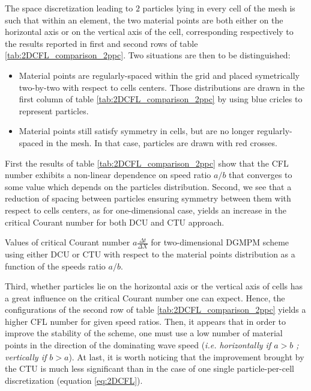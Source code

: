 The space discretization leading to $2$ particles lying in every cell of the mesh is such that within an element, the two material points are both either on the horizontal axis or on the vertical axis of the cell, corresponding respectively to the results reported in first and second rows of table \ref{tab:2DCFL_comparison_2ppc}. Two situations are then to be distinguished:
\begin{itemize}
\item Material points are regularly-spaced within the grid and placed symetrically two-by-two with respect to cells centers. Those distributions are drawn in the first column of table \ref{tab:2DCFL_comparison_2ppc} by using blue cricles to represent particles.
\item Material points still satisfy symmetry in cells, but are no longer regularly-spaced in the mesh. In that case, particles are drawn with red crosses.
\end{itemize}
First the results of table \ref{tab:2DCFL_comparison_2ppc} show that the CFL number exhibits a non-linear dependence on speed ratio $a/b$ that converges to some value which depends on the particles distribution. Second, we see that a reduction of spacing between particles ensuring symmetry between them with respect to cells centers, as for one-dimensional case, yields an increase in the critical Courant number for both DCU and CTU approach. 
\begin{table}[h]
  \centering
  
  \caption{Values of critical Courant number $a\frac{\Delta t}{\Delta X}$ for two-dimensional DGMPM scheme using either DCU or CTU with respect to the material points distribution as a function of the speeds ratio $a/b$.}
  \label{tab:2DCFL_comparison_4ppc}
\end{table}
Third, whether particles lie on the horizontal axis or the vertical axis of cells has a great influence on the critical Courant number one can expect. Hence, the configurations of the second row of table \ref{tab:2DCFL_comparison_2ppc} yields a higher CFL number for given speed ratios. Then, it appears that in order to improve the stability of the scheme, one must use a low number of material points in the direction of the dominating wave speed (\textit{i.e. horizontally if $a>b$ ; vertically if $b>a$}).  
At last, it is worth noticing that the improvement brought by the CTU is much less significant than in the case of one single particle-per-cell discretization (equation \eqref{eq:2DCFL}).

